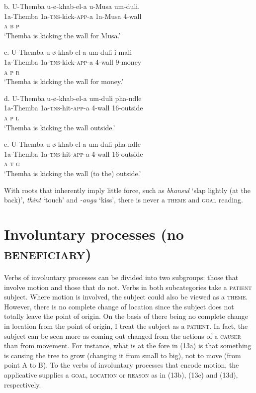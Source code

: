 \documentclass[output=paper]{langsci/langscibook}
\begin{document}
\gll   b.  U-Themba    u-ø-khab-el-a           u-Musa  um-duli. \\
         1a-Themba   1a-\textsc{tns}{}-kick-\textsc{app}{}-a    1a-Musa  4-wall\\
         \textsc{a                    b      p}\\
\glt     ‘Themba is kicking the wall for Musa.’
\z

\gll   c.  U-Themba    u-ø-khab-el-a       um-duli   i-mali\\
         1a-Themba   1a-\textsc{tns}{}-kick-\textsc{app}{}-a   4-wall    9-money\\
         \textsc{a                    p      r}\\
\glt     ‘Themba is kicking the wall for money.’
\z

\gll   d.  U-Themba    u-ø-khab-el-a      um-duli  pha-ndle \\
         1a-Themba  1a-\textsc{tns}{}-hit-\textsc{app}{}-a    4-wall    16-outside\\
         \textsc{a                         p         l}\\
\glt     ‘Themba is kicking the wall outside.’
\z

\gll   e.  U-Themba    u-ø-khab-el-a      um-duli   pha-ndle \\
         1a-Themba  1a-\textsc{tns}{}-hit-\textsc{app}{}-a    4-wall    16-outside\\
         \textsc{a                         t         g}\\
\glt     ‘Themba is kicking the wall (to the) outside.’
\z

With roots that inherently imply little force, such as \textit{bhansul} ‘slap lightly (at the back)’, \textit{thint} ‘touch’ and \textit{{}-anga} ‘kiss’, there is never a \textsc{theme }and \textsc{goal} reading.

\section{Involuntary processes (no \textsc{beneficiary})}

Verbs of involuntary processes can be divided into two subgroups: those that involve motion and those that do not. Verbs in both subcategories take a \textsc{patient} subject. Where motion is involved, the subject could also be viewed as a \textsc{theme}. However, there is no complete change of location since the subject does not totally leave the point of origin. On the basis of there being no complete change in location from the point of origin, I treat the subject as a \textsc{patient}. In fact, the subject can be seen more as coming out changed from the actions of a \textsc{causer} than from movement. For instance, what is at the fore in (13a) is that something is causing the tree to grow (changing it from small to big), not to move (from point A to B). To the verbs of involuntary processes that encode motion, the applicative supplies a \textsc{goal}, \textsc{location} or \textsc{reason} as in (13b), (13c) and (13d), respectively.
\end{document}
